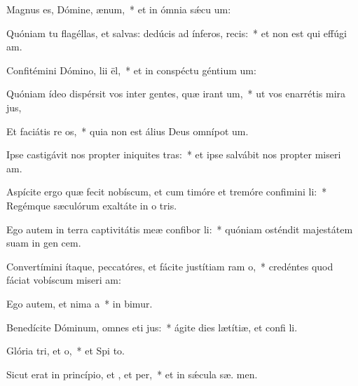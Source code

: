 \item Magnus es, Dómine,  ænum,~* et in ómnia sǽcu  um:
\item Quóniam tu flagéllas, et salvas: dedúcis ad ínferos,  recis:~* et non est qui effúgi  am.
\item Confitémini Dómino, lii ël,~* et in conspéctu géntium  um:
\item Quóniam ídeo dispérsit vos inter gentes, quæ irant um,~* ut vos enarrétis mira jus,
\item Et faciátis re os,~* quia non est álius Deus omnípot  um.
\item Ipse castigávit nos propter iniquites tras:~* et ipse salvábit nos propter miseri am.
\item Aspícite ergo quæ fecit nobíscum, et cum timóre et tremóre confimini li:~* Regémque sæculórum exaltáte in o tris.
\item Ego autem in terra captivitátis meæ confibor li:~* quóniam osténdit majestátem suam in gen cem.
\item Convertímini ítaque, peccatóres, et fácite justítiam ram o,~* credéntes quod fáciat vobíscum miseri am:
\item Ego autem, et nima a~* in  bimur.
\item Benedícite Dóminum, omnes eti jus:~* ágite dies lætítiæ, et confi li.
\item Glória tri, et o,~* et Spi to.
\item Sicut erat in princípio, et , et per,~* et in sǽcula sæ. men.
